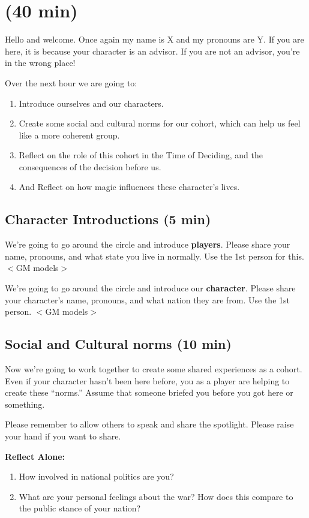 \documentclass[green]{GL2020}
\begin{document}
\name{\gPreGameAdvisor{}}

\section*{(40 min)}

Hello and welcome. Once again my name is X and my pronouns are Y. If you are here, it is because your character is an advisor. If you are not an advisor, you're in the wrong place!

Over the next hour we are going to:
\begin{enumerate}
	\item Introduce ourselves and our characters.
	\item Create some social and cultural norms for our cohort, which can help us feel like a more coherent group.
	\item Reflect on the role of this cohort in the Time of Deciding, and the consequences of the decision before us.
	\item And Reflect on how magic influences these character’s lives.
\end{enumerate}

\subsection*{Character Introductions (5 min)}
We’re going to go around the circle and introduce \textbf{players}. Please share your name, pronouns, and what state you live in normally. Use the 1st person for this. $<$GM models$>$

We’re going to go around the circle and introduce our \textbf{character}. Please share your character’s name, pronouns, and what nation they are from. Use the 1st person. $<$GM models$>$


\subsection*{Social and Cultural norms (10 min)}
Now we’re going to work together to create some shared experiences as a cohort. Even if your character hasn’t been here before, you as a player are helping to create these ``norms.'' Assume that someone briefed you before you got here or something.

Please remember to allow others to speak and share the spotlight.  Please raise your hand if you want to share.

\textbf{Reflect Alone:} 
\begin{enumerate}
	\item How involved in national politics are you?
	\item What are your personal feelings about the war? How does this compare to the public stance of your nation?
\end{enumerate}
\end{document}
